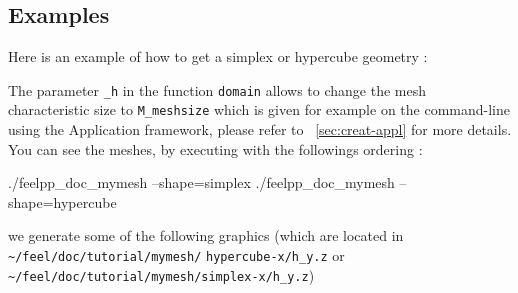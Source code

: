


%


\subsection{Examples}
\label{mesh:examples}
Here is an example of how to get a simplex or hypercube geometry :


The parameter \lstinline!_h! in the function \lstinline!domain! allows to change the mesh characteristic size to \lstinline!M_meshsize! which is given for example on the command-line using the Application framework, please refer to ~\ref{sec:creat-appl} for more details. You can see the meshes, by executing with the followings ordering :

\begin{unixcom}
		./feelpp_doc_mymesh --shape=simplex
		./feelpp_doc_mymesh --shape=hypercube
\end{unixcom}
we generate some of the following graphics (which are located in \verb|~/feel/doc/tutorial/mymesh/| \newline \verb|hypercube-x/h_y.z| or \verb|~/feel/doc/tutorial/mymesh/simplex-x/h_y.z|)



